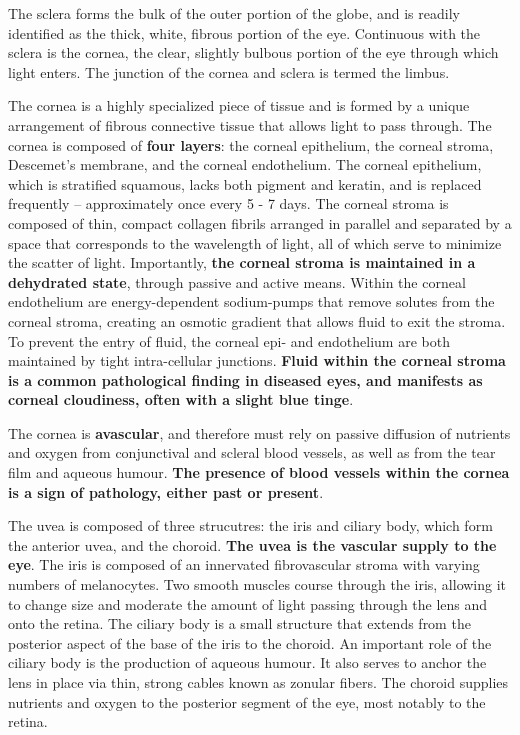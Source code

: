 \documentclass[
  openany]{article}
\begin{document}
The sclera forms the bulk of the outer portion of the globe, and is readily identified as the thick, white, fibrous portion of the eye. Continuous with the sclera is the cornea, the clear, slightly bulbous portion of the eye through which light enters. The junction of the cornea and sclera is termed the limbus.

The cornea is a highly specialized piece of tissue and is formed by a unique arrangement of fibrous connective tissue that allows light to pass through. The cornea is composed of \textbf{four layers}: the corneal epithelium, the corneal stroma, Descemet's membrane, and the corneal endothelium. The corneal epithelium, which is stratified squamous, lacks both pigment and keratin, and is replaced frequently -- approximately once every 5 - 7 days. The corneal stroma is composed of thin, compact collagen fibrils arranged in parallel and separated by a space that corresponds to the wavelength of light, all of which serve to minimize the scatter of light. Importantly, \textbf{the corneal stroma is maintained in a dehydrated state}, through passive and active means. Within the corneal endothelium are energy-dependent sodium-pumps that remove solutes from the corneal stroma, creating an osmotic gradient that allows fluid to exit the stroma. To prevent the entry of fluid, the corneal epi- and endothelium are both maintained by tight intra-cellular junctions. \textbf{Fluid within the corneal stroma is a common pathological finding in diseased eyes, and manifests as corneal cloudiness, often with a slight blue tinge}.

The cornea is \textbf{avascular}, and therefore must rely on passive diffusion of nutrients and oxygen from conjunctival and scleral blood vessels, as well as from the tear film and aqueous humour. \textbf{The presence of blood vessels within the cornea is a sign of pathology, either past or present}.

The uvea is composed of three strucutres: the iris and ciliary body, which form the anterior uvea, and the choroid. \textbf{The uvea is the vascular supply to the eye}. The iris is composed of an innervated fibrovascular stroma with varying numbers of melanocytes. Two smooth muscles course through the iris, allowing it to change size and moderate the amount of light passing through the lens and onto the retina. The ciliary body is a small structure that extends from the posterior aspect of the base of the iris to the choroid. An important role of the ciliary body is the production of aqueous humour. It also serves to anchor the lens in place via thin, strong cables known as zonular fibers. The choroid supplies nutrients and oxygen to the posterior segment of the eye, most notably to the retina.
\end{document}
